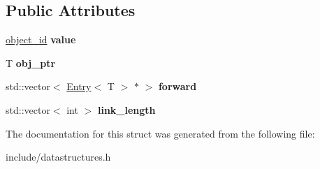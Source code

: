 \subsection*{Public Attributes}
\begin{DoxyCompactItemize}
\item 
\hypertarget{structmlnet_1_1_entry_a6e939230c20aefb219c0bce872e462c5}{\hyperlink{namespacemlnet_a318fc9bfdb74e1da4d44d0c50d4a453d}{object\+\_\+id} {\bfseries value}}\label{structmlnet_1_1_entry_a6e939230c20aefb219c0bce872e462c5}

\item 
\hypertarget{structmlnet_1_1_entry_a6a878f1a66a873532a89bdf57ebad107}{T {\bfseries obj\+\_\+ptr}}\label{structmlnet_1_1_entry_a6a878f1a66a873532a89bdf57ebad107}

\item 
\hypertarget{structmlnet_1_1_entry_a7d235d8126cdfc94ed7f10dc230d08ce}{std\+::vector$<$ \hyperlink{structmlnet_1_1_entry}{Entry}$<$ T $>$ $\ast$ $>$ {\bfseries forward}}\label{structmlnet_1_1_entry_a7d235d8126cdfc94ed7f10dc230d08ce}

\item 
\hypertarget{structmlnet_1_1_entry_aa2c67b91e348debc3b51ce56ffb5023f}{std\+::vector$<$ int $>$ {\bfseries link\+\_\+length}}\label{structmlnet_1_1_entry_aa2c67b91e348debc3b51ce56ffb5023f}

\end{DoxyCompactItemize}


The documentation for this struct was generated from the following file\+:\begin{DoxyCompactItemize}
\item 
include/datastructures.\+h\end{DoxyCompactItemize}
